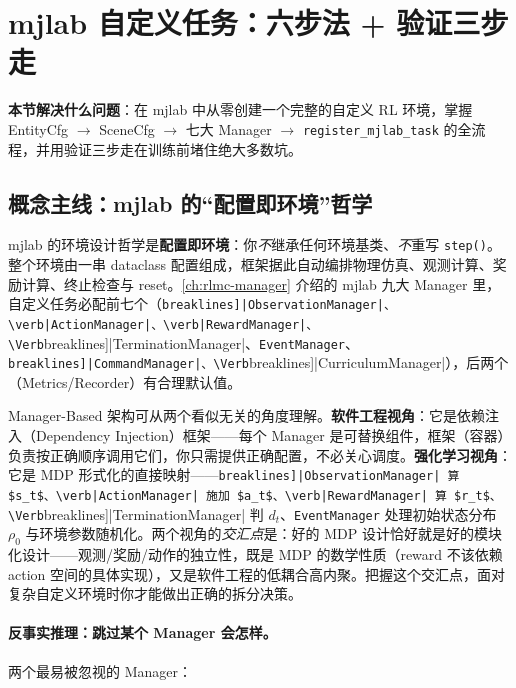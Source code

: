 \section{mjlab 自定义任务：六步法 + 验证三步走}
\label{sec:rlmc-diy-mjlab}

\textbf{本节解决什么问题}：在 mjlab 中从零创建一个完整的自定义 RL 环境，掌握 EntityCfg $\to$ SceneCfg $\to$ 七大 Manager $\to$ \texttt{register\_mjlab\_task} 的全流程，并用验证三步走在训练前堵住绝大多数坑。

\subsection{概念主线：mjlab 的“配置即环境”哲学}
\label{sec:rlmc-diy-mjlab-philosophy}

mjlab 的环境设计哲学是\textbf{配置即环境}：你\emph{不}继承任何环境基类、\emph{不}重写 \verb|step()|。整个环境由一串 dataclass 配置组成，框架据此自动编排物理仿真、观测计算、奖励计算、终止检查与 reset。\cref{ch:rlmc-manager} 介绍的 mjlab 九大 Manager 里，自定义任务必配前七个（\Verb[breaklines]|ObservationManager|、\verb|ActionManager|、\verb|RewardManager|、\Verb[breaklines]|TerminationManager|、\verb|EventManager|、\Verb[breaklines]|CommandManager|、\Verb[breaklines]|CurriculumManager|），后两个（Metrics/Recorder）有合理默认值。

\begin{insight}\label{ins:rlmc-diy-di}
Manager-Based 架构可从两个看似无关的角度理解。\textbf{软件工程视角}：它是依赖注入（Dependency Injection）框架——每个 Manager 是可替换组件，框架（容器）负责按正确顺序调用它们，你只需提供正确配置，不必关心调度。\textbf{强化学习视角}：它是 MDP 形式化的直接映射——\Verb[breaklines]|ObservationManager| 算 $s_t$、\verb|ActionManager| 施加 $a_t$、\verb|RewardManager| 算 $r_t$、\Verb[breaklines]|TerminationManager| 判 $d_t$、\verb|EventManager| 处理初始状态分布 $\rho_0$ 与环境参数随机化。两个视角的\emph{交汇点}是：好的 MDP 设计恰好就是好的模块化设计——观测/奖励/动作的独立性，既是 MDP 的数学性质（reward 不该依赖 action 空间的具体实现），又是软件工程的低耦合高内聚。把握这个交汇点，面对复杂自定义环境时你才能做出正确的拆分决策。
\end{insight}

\paragraph{反事实推理：跳过某个 Manager 会怎样。}两个最易被忽视的 Manager：

